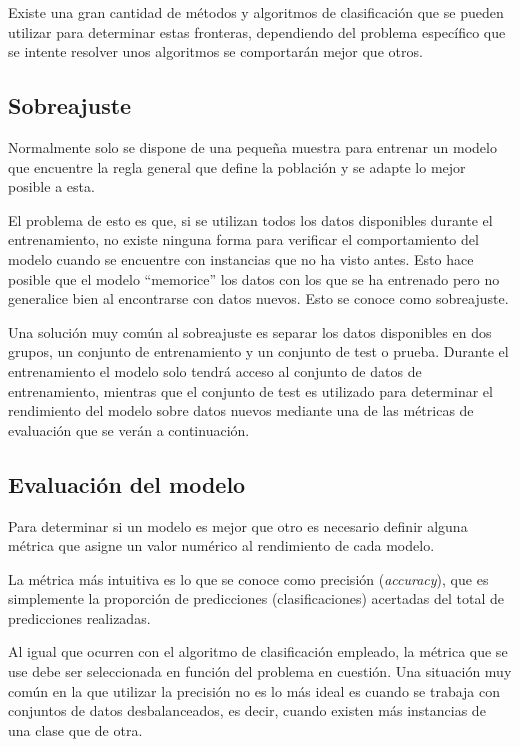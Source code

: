 Existe una gran cantidad de métodos y algoritmos de clasificación que se pueden
utilizar para determinar estas fronteras, dependiendo del problema específico
que se intente resolver unos algoritmos se comportarán mejor que otros.


\subsection{Sobreajuste}

Normalmente solo se dispone de una pequeña muestra para entrenar un modelo que
encuentre la regla general que define la población y se adapte lo mejor posible
a esta.

El problema de esto es que, si se utilizan todos los datos disponibles durante
el entrenamiento, no existe ninguna forma para verificar el comportamiento del
modelo cuando se encuentre con instancias que no ha visto antes. Esto hace
posible que el modelo ``memorice'' los datos con los que se ha entrenado pero no
generalice bien al encontrarse con datos nuevos. Esto se conoce como
sobreajuste.


Una solución muy común al sobreajuste es separar los datos disponibles en dos
grupos, un conjunto de entrenamiento y un conjunto de test o prueba. Durante el
entrenamiento el modelo solo tendrá acceso al conjunto de datos de
entrenamiento, mientras que el conjunto de test es utilizado para determinar el
rendimiento del modelo sobre datos nuevos mediante una de las métricas de
evaluación que se verán a continuación.

\subsection{Evaluación del modelo}

Para determinar si un modelo es mejor que otro es necesario definir alguna
métrica que asigne un valor numérico al rendimiento de cada modelo.

La métrica más intuitiva es lo que se conoce como precisión (\textit{accuracy}),
que es simplemente la proporción de predicciones (clasificaciones) acertadas del
total de predicciones realizadas.

Al igual que ocurren con el algoritmo de clasificación empleado, la métrica que
se use debe ser seleccionada en función del problema en cuestión. Una situación
muy común en la que utilizar la precisión no es lo más ideal es cuando se
trabaja con conjuntos de datos desbalanceados, es decir, cuando existen más
instancias de una clase que de otra.

